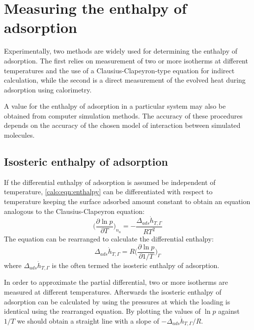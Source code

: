 
\section{Measuring the enthalpy of adsorption}

Experimentally, two methods are widely used for determining the
enthalpy of adsorption. The first relies on measurement of two
or more isotherms at different temperatures and the use of
a Clausius-Clapeyron-type equation for indirect calculation,
while the second is a direct measurement of the evolved heat
during adsorption using calorimetry.

A value for the enthalpy of adsorption in a particular system
may also be obtained from computer simulation methods.
The accuracy of these procedures depends on the accuracy of
the chosen model of interaction between simulated molecules.

\subsection{Isosteric enthalpy of adsorption}

If the differential enthalpy of adsorption is assumed be independent
of temperature, \autoref{calo:eqn:enthalpy} can be differentiated
with respect to temperature keeping the surface adsorbed amount constant
to obtain an equation analogous to the Clausius-Clapeyron equation:
%
\begin{equation}
	\Big( \frac{\partial \ln p}{\partial T} \Big)_{n_a} = -\frac{\Delta_{ads}\dot{h}_{T, \Gamma}}{R T^2}
\end{equation}
%
The equation can be rearranged to calculate the differential enthalpy:
%
\begin{equation}\label{calo:eqn:claus-clap}
	\Delta_{ads}\dot{h}_{T, \Gamma} = R \Big( \frac{\partial \ln p}{\partial 1 / T} \Big)_{\Gamma}
\end{equation}
%
where \(\Delta_{ads}\dot{h}_{T, \Gamma}\) is the often termed the
isosteric enthalpy of adsorption.

In order to approximate the partial differential, two or more
isotherms are measured at different temperatures.
Afterwards the isosteric enthalpy of adsorption can be calculated
by using the pressures at which the loading is identical using the
rearranged equation. By plotting the values of \(\ln p\) against
\(1 / T\) we should obtain a straight line with a slope
of \(- \Delta_{ads}\dot{h}_{T, \Gamma} / R\).

